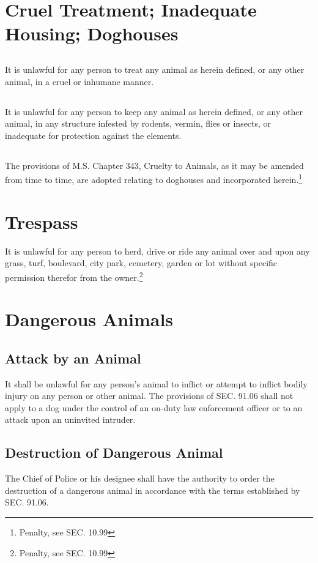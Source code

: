 \section{Cruel Treatment; Inadequate Housing; Doghouses}
\subsection{}
It is unlawful for any person to treat any animal as herein defined, or any other animal, in a cruel or inhumane manner.
\subsection{}
It is unlawful for any person to keep any animal as herein defined, or any other animal, in any structure infested by rodents, vermin, flies or insects, or inadequate for protection against the elements.
\subsection{}
The provisions of M.S. Chapter 343, Cruelty to Animals, as it may be amended from time to time, are adopted relating to doghouses and incorporated herein.\footnote{Penalty, see SEC. 10.99}

\section{Trespass}
It is unlawful for any person to herd, drive or ride any animal over and upon any grass, turf, boulevard, city park, cemetery, garden or lot without specific permission therefor from the owner.\footnote{Penalty, see SEC. 10.99}

\section{Dangerous Animals}
\subsection{Attack by an Animal}
It shall be unlawful for any person’s animal to inflict or attempt to inflict bodily injury on any person or other animal. The provisions of SEC. 91.06 shall not apply to a dog under the control of an on-duty law enforcement officer or to an attack upon an uninvited intruder.
\subsection{Destruction of Dangerous Animal}
The Chief of Police or his designee shall have the authority to order the destruction of a dangerous animal in accordance with the terms established by SEC. 91.06.
